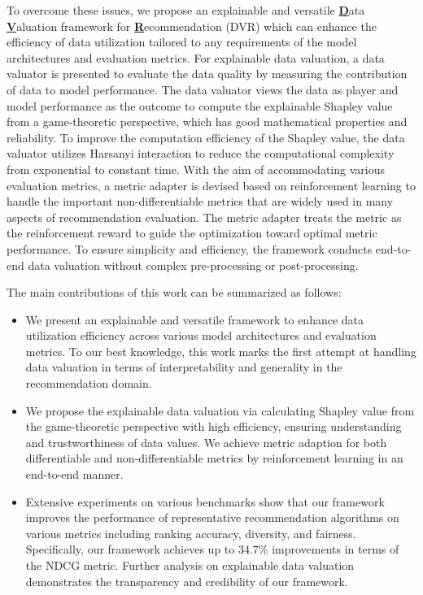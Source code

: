 To overcome these issues, we propose an explainable and versatile \textbf{\underline{D}}ata \textbf{\underline{V}}aluation framework for \textbf{\underline{R}}ecommendation (DVR) which can enhance the efficiency of data utilization tailored to any requirements of the model architectures and evaluation metrics. For explainable data valuation, a data valuator is presented to evaluate the data quality by measuring the contribution of data to model performance. The data valuator views the data as player and model performance as the outcome to compute the explainable Shapley value from a game-theoretic perspective, which has good mathematical properties and reliability. To improve the computation efficiency of the Shapley value, the data valuator utilizes Harsanyi interaction to reduce the computational complexity from exponential to constant time. With the aim of accommodating various evaluation metrics, a metric adapter is devised based on reinforcement learning to handle the important non-differentiable metrics that are widely used in many aspects of recommendation evaluation. The metric adapter treats the metric as the reinforcement reward to guide the optimization toward optimal metric performance. To ensure simplicity and efficiency, the framework conducts end-to-end data valuation without complex pre-processing or post-processing. 

The main contributions of this work can be summarized as follows:
\begin{itemize}
    \item We present an explainable and versatile framework to enhance data utilization efficiency across various model architectures and evaluation metrics. To our best knowledge, this work marks the first attempt at handling data valuation in terms of interpretability and generality in the recommendation domain.
    \item 
 We propose the explainable data valuation via calculating Shapley value from the game-theoretic perspective with high efficiency, ensuring understanding and trustworthiness of data values. We achieve metric adaption for both differentiable and non-differentiable metrics by reinforcement learning in an end-to-end manner.
    \item 
 Extensive experiments on various benchmarks show that our framework improves the performance of representative recommendation algorithms on various metrics including ranking accuracy, diversity, and fairness. Specifically, our framework achieves up to 34.7\% improvements in terms of the NDCG metric. Further analysis on explainable data valuation demonstrates the transparency and credibility of our framework.
\end{itemize}
